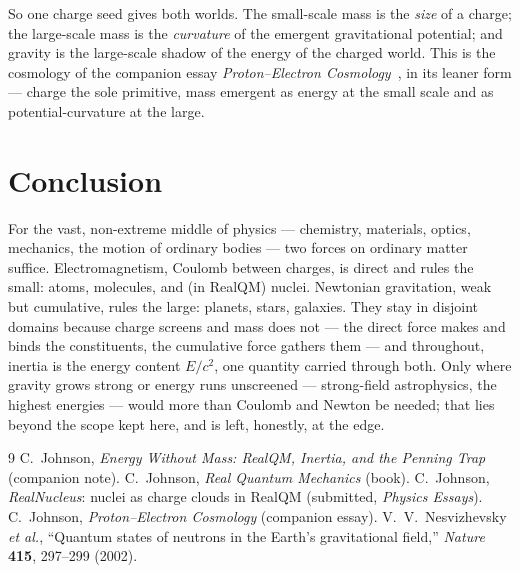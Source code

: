 \documentclass[11pt]{article}
\begin{document}
So one charge seed gives both worlds. The small-scale mass is the \emph{size} of a charge; the large-scale mass is
the \emph{curvature} of the emergent gravitational potential; and gravity is the large-scale shadow of the energy
of the charged world. This is the cosmology of the companion essay \emph{Proton--Electron
Cosmology}~\cite{Cosmology}, in its leaner form --- charge the sole primitive, mass emergent as energy at the small
scale and as potential-curvature at the large.

\section{Conclusion}
For the vast, non-extreme middle of physics --- chemistry, materials, optics, mechanics, the motion of ordinary
bodies --- two forces on ordinary matter suffice. Electromagnetism, Coulomb between charges, is direct and rules
the small: atoms, molecules, and (in RealQM) nuclei. Newtonian gravitation, weak but cumulative, rules the large:
planets, stars, galaxies. They stay in disjoint domains because charge screens and mass does not --- the direct
force makes and binds the constituents, the cumulative force gathers them --- and throughout, inertia is the energy
content $E/c^2$, one quantity carried through both. Only where gravity grows strong or energy runs unscreened ---
strong-field astrophysics, the highest energies --- would more than Coulomb and Newton be needed; that lies beyond
the scope kept here, and is left, honestly, at the edge.

\begin{thebibliography}{9}
 C.~Johnson, \emph{Energy Without Mass: RealQM, Inertia, and the Penning Trap} (companion note).
 C.~Johnson, \emph{Real Quantum Mechanics} (book).
 C.~Johnson, \emph{RealNucleus}: nuclei as charge clouds in RealQM
  (submitted, \emph{Physics Essays}).
 C.~Johnson, \emph{Proton--Electron Cosmology} (companion essay).
 V.~V.~Nesvizhevsky \emph{et al.}, ``Quantum states of neutrons in the Earth's
  gravitational field,'' \emph{Nature} \textbf{415}, 297--299 (2002).
\end{thebibliography}
\end{document}
